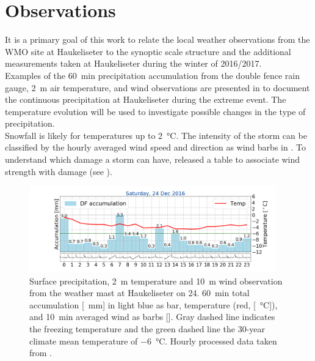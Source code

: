 \section{Observations}
\label{sec:loc_obs}
It is a primary goal of this work to relate the local weather observations from the WMO site at Haukeliseter to the synoptic scale structure and the additional measurements taken at Haukeliseter during the winter of 2016/2017.
\\
Examples of the \SI{60}{\minute} precipitation accumulation from the double fence rain gauge, \SI{2}{\metre} air temperature, and wind observations are presented in  to document the continuous precipitation at Haukeliseter during the extreme event. The temperature evolution will be used to investigate possible changes in the type of precipitation. 
\\
Snowfall is likely for temperatures up to \SI{2}{\celsius}. The intensity of the storm can be classified by the hourly averaged wind speed and direction as wind barbs in \SI{}{\mPs}.
To understand which damage a storm can have, \cite{faeraas_urd_2016} released a table to associate wind strength with damage (see ).
 \begin{figure}[H]
 	\centering
		\includegraphics[trim={4.9cm 1.cm 1.5cm 1cm},clip,
		width=0.95\textwidth]{./fig_weathermast/T_P_U_20161224}
 \caption{Surface precipitation, \SI{2}{\metre} temperature and \SI{10}{\metre} wind observation from the weather mast at Haukeliseter on \SI{24}{\dec}. \SI{60}{\minute} total accumulation [\SI{}{\mm}] in light blue as bar, temperature (red, [\SI{}{\celsius}]), and \SI{10}{\minute} averaged wind as barbs [\SI{}{\mPs}]. Gray dashed line indicates the freezing temperature and the green dashed line the 30-year climate mean temperature of \SI{-6}{\celsius}. Hourly processed data taken from \cite{eklima_norwegian_2016}.} \label{fig:TPU24_pres}
 \end{figure}
